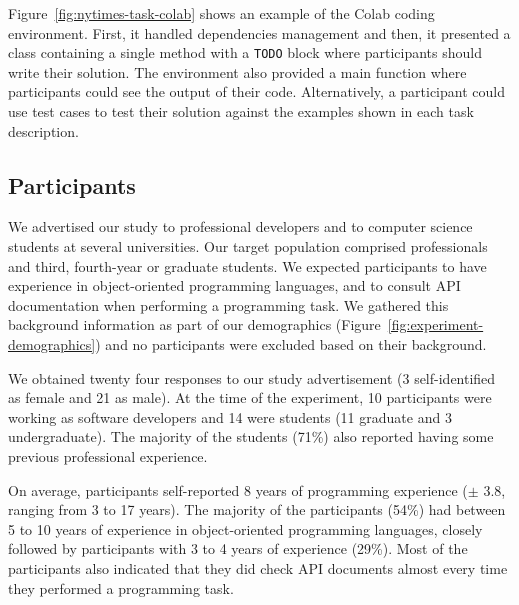 Figure~\ref{fig:nytimes-task-colab} shows an example of the Colab coding environment. 
First, it handled dependencies management and then, 
it presented a class containing a single method with a \texttt{TODO} block where 
participants should write their solution. 
The environment also provided a main function where participants could see the output
of their code. Alternatively, a participant could use test cases to test their solution
against the examples shown in each task description.




\subsection{Participants}
\label{cp6:participants}


We advertised our study to professional developers and to computer science students at  several universities. 
Our target population comprised professionals and third, fourth-year or graduate students.
We expected participants to have experience in object-oriented programming languages, and to consult API documentation when performing a programming task.
We gathered this background information as part of our demographics (Figure~\ref{fig:experiment-demographics})
and no participants were excluded
based on their background.






We obtained twenty four responses to our study advertisement (3 self-identified as female and 21 as male). 
At the time of the experiment, 10 participants were working as software
developers and 14 were students (11 graduate and 3 undergraduate).
The majority of the students (71\%) also reported having some previous professional experience.


On average, participants self-reported 8 years of programming experience ({\small $\pm$} 3.8, ranging from 3 to 17 years).
The majority of the participants (54\%) had between 5 to 10 years of experience in object-oriented programming languages,
closely followed by participants  with  3 to 4 years of experience (29\%). 
Most of the participants also indicated that they did check API documents almost every time they performed a programming task. 








